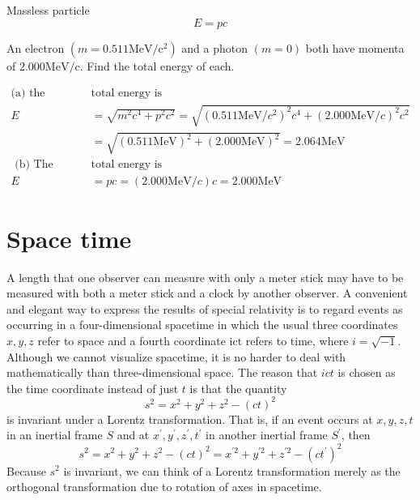  Massless particle
 $$E=p c$$
 \begin{exercise}
 	An electron $\left(m=0.511 \mathrm{MeV} / \mathrm{c}^{2}\right)$ and a photon $(m=0)$ both have momenta of $2.000 \mathrm{MeV} / \mathrm{c}$. Find the total energy of each.
 \end{exercise}
\begin{answer}
 \begin{align*}
 \text{(a) the electron's }&\text{total energy is}\\
 	E &=\sqrt{m^{2} c^{4}+p^{2} c^{2}}=\sqrt{\left(0.511 \mathrm{MeV} / c^{2}\right)^{2} c^{4}+(2.000 \mathrm{MeV} / c)^{2} c^{2}} \\
 	&=\sqrt{(0.511 \mathrm{MeV})^{2}+(2.000 \mathrm{MeV})^{2}}=2.064 \mathrm{MeV}\\
 \text{	(b) The photon's }&\text{total energy is}\\
 	E&=p c=(2.000 \mathrm{MeV} / c) c=2.000 \mathrm{MeV}	
 \end{align*}
\end{answer}
\section{Space time}
 A length that one observer can measure with only a meter stick may have to be measured with both a meter stick and a clock by another observer. A convenient and elegant way to express the results of special relativity is to regard events as occurring in a four-dimensional spacetime in which the usual three coordinates $x, y, z$ refer to space and a fourth coordinate ict refers to time, where $i=\sqrt{-1}$. Although we cannot visualize spacetime, it is no harder to deal with mathematically than three-dimensional space.
The reason that $i c t$ is chosen as the time coordinate instead of just $t$ is that the quantity
$$
s^{2}=x^{2}+y^{2}+z^{2}-(c t)^{2}
$$
is invariant under a Lorentz transformation. That is, if an event occurs at $x, y, z, t$ in an inertial frame $S$ and at $x^{\prime}, y^{\prime}, z^{\prime}, t^{\prime}$ in another inertial frame $S^{\prime}$, then
$$
s^{2}=x^{2}+y^{2}+z^{2}-(c t)^{2}=x^{\prime 2}+y^{\prime 2}+z^{\prime 2}-\left(c t^{\prime}\right)^{2}
$$
Because $s^{2}$ is invariant, we can think of a Lorentz transformation merely as the orthogonal transformation due to rotation of axes  in spacetime.
